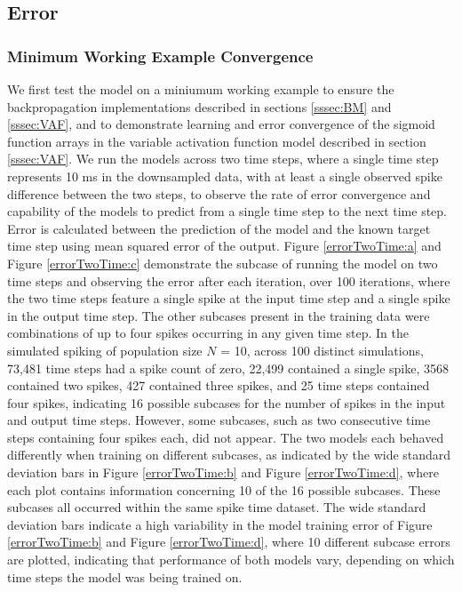 \documentclass[11pt,titlepage]{article}
\begin{document}
\subsection{Error}

\subsubsection{Minimum Working Example Convergence}
We first test the model on a miniumum working example to ensure the backpropagation implementations described in sections \ref{sssec:BM} and \ref{sssec:VAF}, and to demonstrate learning and error convergence of the sigmoid function arrays in the variable activation function model described in section \ref{sssec:VAF}. We run the models across two time steps, where a single time step represents 10 ms in the downsampled data, with at least a single observed spike difference between the two steps, to observe the rate of error convergence and capability of the models to predict from a single time step to the next time step. Error is calculated between the prediction of the model and the known target time step using mean squared error of the output. Figure \ref{errorTwoTime:a} and Figure \ref{errorTwoTime:c} demonstrate the subcase of running the model on two time steps and observing the error after each iteration, over 100 iterations, where the two time steps feature a single spike at the input time step and a single spike in the output time step. The other subcases present in the training data were combinations of up to four spikes occurring in any given time step. In the simulated spiking of population size $N$ = 10, across 100 distinct simulations, 73,481 time steps had a spike count of zero, 22,499 contained a single spike, 3568 contained two spikes, 427 contained three spikes, and 25 time steps contained four spikes, indicating 16 possible subcases for the number of spikes in the input and output time steps. However, some subcases, such as two consecutive time steps containing four spikes each, did not appear. The two models each behaved differently when training on different subcases, as indicated by the wide standard deviation bars in Figure \ref{errorTwoTime:b} and Figure \ref{errorTwoTime:d}, where each plot contains information concerning 10 of the 16 possible subcases. These subcases all occurred within the same spike time dataset. The wide standard deviation bars indicate a high variability in the model training error of Figure \ref{errorTwoTime:b} and Figure \ref{errorTwoTime:d}, where 10 different subcase errors are plotted, indicating that performance of both models vary, depending on which time steps the model was being trained on. 
\end{document}
